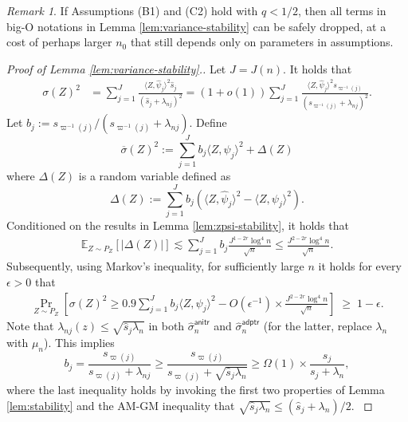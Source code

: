 \documentclass[11pt,a4paper]{article}
\renewcommand{\hat}{\widehat}
\renewcommand{\bar}{\overline}
\theoremstyle{definition}
\theoremstyle{plain}
\theoremstyle{remark}
\newtheorem{remark}{Remark}[section]
\newcommand{\anitr}{\mathsf{anitr}}
\newcommand{\adptr}{\mathsf{adptr}}
\begin{document}
\begin{remark}
If Assumptions (B1) and (C2) hold with $q<1/2$, then all terms in big-O notations in Lemma \ref{lem:variance-stability} can be safely dropped, at a cost of perhaps larger $n_0$ that still depends only on parameters in assumptions.
\end{remark}

\begin{proof}[Proof of Lemma \ref{lem:variance-stability}.]
Let $J=J(n)$.
It holds that
\begin{align*}
\sigma(Z)^2 &= \sum_{j=1}^J \frac{\langle Z,\hat\psi_j\rangle^2\hat s_j}{(\hat s_j+\lambda_{nj})^2} = (1+o(1))\sum_{j=1}^J\frac{\langle Z,\hat\psi_j\rangle^2 s_{\varpi^{-1}(j)}}{(s_{\varpi^{-1}(j)}+\lambda_{nj})^2}.
\end{align*} 
{\color{orange}
Let $b_j := s_{\varpi^{-1}(j)}/(s_{\varpi^{-1}(j)}+\lambda_{nj}).$ Define
$$
\bar\sigma(Z)^2 := \sum_{j=1}^J b_j \langle Z,\psi_j\rangle^2+ \Delta(Z)
$$
where $\Delta(Z)$ is a random variable defined as
$$
\Delta(Z) := \sum_{j=1}^J b_j(\langle Z,\hat\psi_j\rangle^2-\langle Z,\psi_j\rangle^2).
$$
Conditioned on the results in Lemma \ref{lem:zpsi-stability}, it holds that
\begin{align*}
\mathbb E_{Z\sim P_Z}[|\Delta(Z)|] \lesssim \sum_{j=1}^J b_j\frac{J^{1-2r}\log^4 n}{\sqrt{n}}\leq \frac{J^{2-2r}\log^4 n}{\sqrt{n}}.
\end{align*}
Subsequently, using Markov's inequality, for sufficiently large $n$ it holds for every $\epsilon>0$ that
\begin{align}
\Pr_{Z\sim P_Z}\left[\sigma(Z)^2\geq 0.9\sum_{j=1}^Jb_j\langle Z,\psi_j\rangle^2 - O(\epsilon^{-1})\times\frac{J^{2-2r}\log^4 n}{\sqrt{n}}\right] \;\geq\; 1-\epsilon.
\label{eq:proof-variance-stability-1}
\end{align}
Note that $\lambda_{nj}(z)\leq \sqrt{\hat s_j\lambda_n}$ in both $\hat\sigma_n^{\anitr}$ and $\hat\sigma_n^{\adptr}$ (for the latter, replace $\lambda_n$ with $\mu_n$).
This implies
$$
b_j = \frac{s_{\varpi(j)}}{s_{\varpi(j)}+\lambda_{nj}} \geq \frac{s_{\varpi(j)}}{s_{\varpi(j)}+\sqrt{\hat s_j\lambda_n}} \geq \Omega(1)\times \frac{s_j}{s_j+\lambda_n},
$$
where the last inequality holds by invoking the first two properties of Lemma \ref{lem:stability} and the AM-GM inequality that $\sqrt{\hat s_j\lambda_n} \leq (\hat s_j+\lambda_n)/2$.
}
\end{proof}
\end{document}
